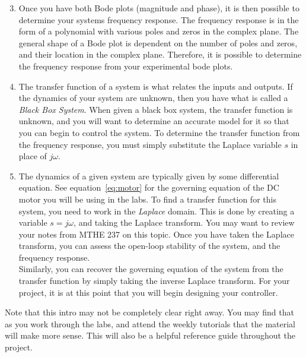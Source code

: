 \begin{enumerate}
	\setcounter{enumi}{2}
\item Once you have both Bode plots (magnitude and phase), it is then possible to determine 
your systems frequency response. The frequency response is in the form of a polynomial with various poles and zeros 
in the complex plane. The general shape of a Bode plot is dependent on the number of poles and zeros, 
and their location in the complex plane. Therefore, it is possible to determine the frequency response from 
your experimental bode plots. 
\item The transfer function of a system is what relates the inputs and outputs. If the dynamics of your system are unknown, 
then you have what is called a \emph{Black Box System}. When given a black box system, the transfer 
function is unknown, and you will want to determine an accurate model for it so that you can begin to control the 
system. To determine the transfer function from the frequency response, you must simply substitute the Laplace variable 
$s$ in place of $j\omega$.
\item The dynamics of a given system are typically given by some differential equation. See equation~\ref{eq:motor} 
for the governing equation of the DC motor you will be using in the labs. To find a transfer function for this system, you 
need to work in the \emph{Laplace} domain. This is done by creating  a variable $s=j\omega$, and taking the 
Laplace transform. You may want to review your notes from MTHE 237 on this topic. Once you have taken the 
Laplace transform, you can assess the open-loop stability of the system, and the frequency response. \\
Similarly, you can recover the governing equation of the system from the transfer function by simply taking 
the inverse Laplace transform. For your project, it is at this point that you will begin designing your controller. 
\end{enumerate}
Note that this intro may not be completely clear right away. You may find that as you work through the labs, and 
attend the weekly tutorials that the material will make more sense. This will also be a helpful reference guide 
throughout the project. 